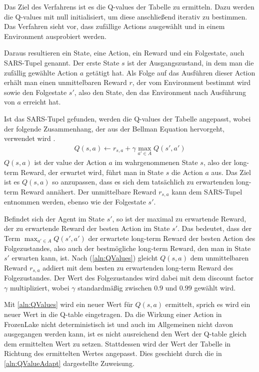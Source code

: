 \documentclass[11pt]{scrartcl}
\begin{document}
\noindent
Das Ziel des Verfahrens ist es die Q-values der Tabelle zu ermitteln. Dazu werden die
Q-values mit null initialisiert, um diese anschließend iterativ zu bestimmen. Das Verfahren 
sieht vor, dass zufällige Actions ausgewählt und in einem Environment ausprobiert werden.

Daraus resultieren ein State, eine Action, ein Reward und ein Folgestate, auch SARS-Tupel
genannt. Der erste State $s$ ist der Ausgangszustand, in dem man die zufällig gewählte
Action $a$ getätigt hat. Als Folge auf das Ausführen dieser Action erhält man einen
unmittelbaren Reward $r$, der vom Environment bestimmt wird sowie den Folgestate $s'$,
also den State, den das Environment nach Ausführung von $a$ erreicht hat.

Ist das SARS-Tupel gefunden, werden die Q-values der Tabelle angepasst, wobei der folgende
Zusammenhang, der aus der Bellman Equation hervorgeht, verwendet wird
\cite[~S.193 ff.]{L2018}.
\begin{align}
  Q(s, a) \leftarrow r_{s,a} + \gamma \max_{a' \in A}Q(s', a')
  \label{aln:QValues}
\end{align}
\noindent
$Q(s, a)$ ist der value der Action $a$ im wahrgenommenen State $s$, also der long-term
Reward, der erwartet wird, führt man in State $s$ die Action $a$ aus. Das Ziel ist es
$Q(s, a)$ so anzupassen, dass es sich dem tatsächlich zu erwartenden long-term Reward
annähert. Der unmittelbare Reward $r_{s,a}$ kann dem SARS-Tupel entnommen werden, ebenso
wie der Folgestate $s'$.

Befindet sich der Agent im State $s'$, so ist der maximal zu erwartende Reward, der 
zu erwartende Reward der besten Action im State $s'$. Das bedeutet, dass der Term
$\max_{a'\in A} Q(s', a')$ der erwartete long-term Reward der besten Action des
Folgezustandes, also auch der bestmögliche long-term Reward, den man in State $s'$
erwarten kann, ist. Nach (\ref{aln:QValues}) gleicht $Q(s, a)$ dem unmittelbaren Reward
$r_{s,a}$ addiert mit dem besten zu erwartenden long-term Reward des Folgezustandes. Der
Wert des Folgezustandes wird dabei mit dem discount factor $\gamma$ multipliziert, wobei 
$\gamma$ standardmäßig zwischen $0.9$ und $0.99$ gewählt wird.

Mit \autoref{aln:QValues} wird ein neuer Wert für $Q(s, a)$ ermittelt, sprich es wird ein
neuer Wert in die Q-table eingetragen. Da die Wirkung einer Action in FrozenLake nicht
deterministisch ist und auch im Allgemeinen nicht davon ausgegangen werden kann, ist es
nicht ausreichend den Wert der Q-table gleich dem ermittelten Wert zu setzen. Stattdessen
wird der Wert der Tabelle in Richtung des ermittelten Wertes angepasst. Dies geschieht durch 
die in \autoref{aln:QValueAdapt} dargestellte Zuweisung.
\end{document}

